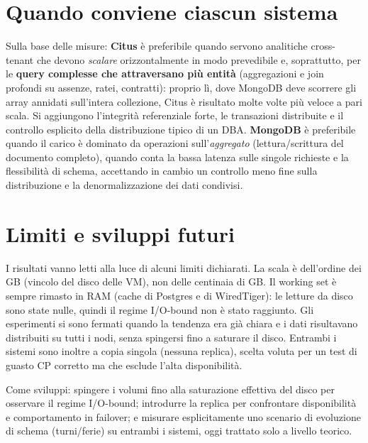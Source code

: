 \section{Quando conviene ciascun sistema}
\label{sec:quando}

Sulla base delle misure: \textbf{Citus} è preferibile quando servono analitiche cross-tenant che devono
\emph{scalare} orizzontalmente in modo prevedibile e, soprattutto, per le \textbf{query complesse che
attraversano più entità} (aggregazioni e join profondi su assenze, ratei, contratti): proprio lì, dove
MongoDB deve scorrere gli array annidati sull'intera collezione, Citus è risultato molte volte più veloce a
pari scala. Si aggiungono l'integrità referenziale forte, le transazioni distribuite e il controllo esplicito
della distribuzione tipico di un DBA. \textbf{MongoDB} è preferibile quando il
carico è dominato da operazioni sull'\emph{aggregato} (lettura/scrittura del documento completo), quando conta
la bassa latenza sulle singole richieste e la flessibilità di schema, accettando in cambio un controllo meno
fine sulla distribuzione e la denormalizzazione dei dati condivisi.

\section{Limiti e sviluppi futuri}
\label{sec:limiti}

I risultati vanno letti alla luce di alcuni limiti dichiarati. La scala è dell'ordine dei GB (vincolo del
disco delle VM), non delle centinaia di GB. Il working set è sempre rimasto in RAM (cache di Postgres e di
WiredTiger): le letture da disco sono state nulle, quindi il regime I/O-bound non è stato raggiunto. Gli
esperimenti si sono fermati quando la tendenza era già chiara e i dati risultavano distribuiti su tutti i
nodi, senza spingersi fino a saturare il disco. Entrambi i sistemi sono inoltre a copia singola (nessuna
replica), scelta voluta per un test di guasto CP corretto ma che esclude l'alta disponibilità.

Come sviluppi: spingere i volumi fino alla saturazione effettiva del disco per osservare il regime I/O-bound;
introdurre la replica per confrontare disponibilità e comportamento in failover; e misurare esplicitamente
uno scenario di evoluzione di schema (turni/ferie) su entrambi i sistemi, oggi trattato solo a livello teorico.
